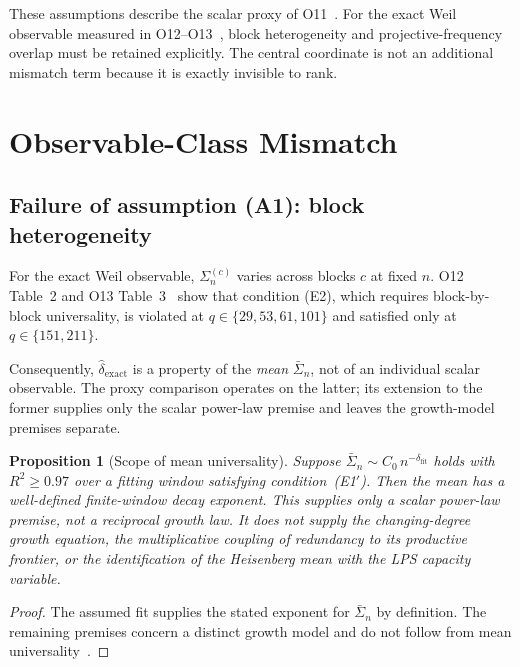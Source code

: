 \documentclass[11pt]{article}
\newtheorem{proposition}[theorem]{Proposition}
\begin{document}
    These assumptions describe the scalar proxy of O11~\cite{Beau2026a15}.
    For the exact Weil observable measured in O12--O13~\cite{Beau2026a16,Beau2026a17}, block
    heterogeneity and projective-frequency overlap must be retained explicitly.
    The central coordinate is not an additional mismatch term because it is exactly invisible to rank.

  \section{Observable-Class Mismatch}
  \label{sec:mismatch}

  \subsection{Failure of assumption (A1): block heterogeneity}
    \label{sec:a1}

    For the exact Weil observable, $\Sigma_n^{(c)}$ varies across blocks $c$ at fixed $n$.
    O12 Table~2 and O13 Table~3~\cite{Beau2026a16,Beau2026a17} show that condition (E2), which
    requires block-by-block universality, is violated at $q \in \{29,53,61,101\}$ and satisfied only
    at $q \in \{151,211\}$.

    Consequently, $\hat{\delta}_{\mathrm{exact}}$ is a property of the \emph{mean}
    $\bar{\Sigma}_n$, not of an individual scalar observable.
    The proxy comparison operates on the latter; its extension to the former supplies only the scalar
    power-law premise and leaves the growth-model premises separate.

    \begin{proposition}[Scope of mean universality]
      \label{prop:mean_universality}
      Suppose $\bar{\Sigma}_n \sim C_0 \, n^{-\delta_{\mathrm{fit}}}$ holds with $R^2 \geq 0.97$ over
      a fitting window satisfying condition~(E1$'$).
      Then the mean has a well-defined finite-window decay exponent.
      This supplies only a scalar power-law premise, not a reciprocal growth law.
      It does not supply the changing-degree growth equation, the multiplicative coupling of
      redundancy to its productive frontier, or the identification of the Heisenberg mean with
      the LPS capacity variable.
    \end{proposition}

    \begin{proof}
      The assumed fit supplies the stated exponent for $\bar{\Sigma}_n$ by definition.
      The remaining premises concern a distinct growth model and do not follow from mean
      universality~\cite{Beau2026sgn}.
    \end{proof}
\end{document}
